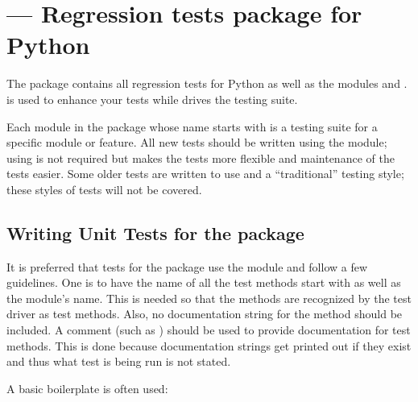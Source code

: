 \section{ ---
         Regression tests package for Python}



The  package contains all regression tests for Python as
well as the modules  and
.   is used to enhance
your tests while  drives the testing suite.

Each module in the  package whose name starts with
 is a testing suite for a specific module or feature.
All new tests should be written using the  module;
using  is not required but makes the tests more
flexible and maintenance of the tests easier.  Some older tests are
written to use  and a ``traditional'' testing
style; these styles of tests will not be covered.

\begin{seealso}
\end{seealso}


\subsection{Writing Unit Tests for the  package%
            \label{writing-tests}}

It is preferred that tests for the  package use the
 module and follow a few guidelines.
One is to have the name of all the test methods start with  as
well as the module's name.
This is needed so that the methods are recognized by the test driver as
test methods.
Also, no documentation string for the method should be included.
A comment (such as
) should be used to provide
documentation for test methods.
This is done because documentation strings get printed out if they exist and
thus what test is being run is not stated.

A basic boilerplate is often used:

